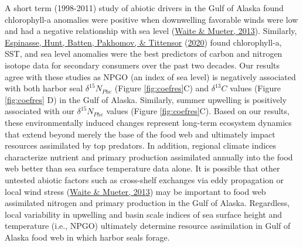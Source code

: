 \documentclass [11pt, proquest] {uwthesis}[2015/03/03]
\begin{document}
A short term (1998-2011) study of abiotic drivers in the Gulf of Alaska found chlorophyll-a anomalies were positive when downwelling favorable winds were low and had a negative relationship with sea level (\protect\hyperlink{ref-Waite2013}{Waite \& Mueter, 2013}). Similarly, \protect\hyperlink{ref-Espinasse2020}{Espinasse, Hunt, Batten, Pakhomov, \& Tittensor} (\protect\hyperlink{ref-Espinasse2020}{2020}) found chlorophyll-a, SST, and sea level anomalies were the best predictors of carbon and nitrogen isotope data for secondary consumers over the past two decades. Our results agree with these studies as NPGO (an index of sea level) is negatively associated with both harbor seal \(\delta^{15}N_{Phe}\) (Figure \ref{fig:coefres}C) and \(\delta^{13}C\) values (Figure \ref{fig:coefres} D) in the Gulf of Alaska. Similarly, summer upwelling is positively associated with our \(\delta^{15}N_{Phe}\) values (Figure \ref{fig:coefres}C). Based on our results, these environmentally induced changes represent long-term ecosystem dynamics that extend beyond merely the base of the food web and ultimately impact resources assimilated by top predators. In addition, regional climate indices characterize nutrient and primary production assimilated annually into the food web better than sea surface temperature data alone. It is possible that other untested abiotic factors such as cross-shelf exchanges via eddy propagation or local wind stress (\protect\hyperlink{ref-Waite2013}{Waite \& Mueter, 2013}) may be important to food web assimilated nitrogen and primary production in the Gulf of Alaska. Regardless, local variability in upwelling and basin scale indices of sea surface height and temperature (i.e., NPGO) ultimately determine resource assimilation in Gulf of Alaska food web in which harbor seals forage.
\end{document}
